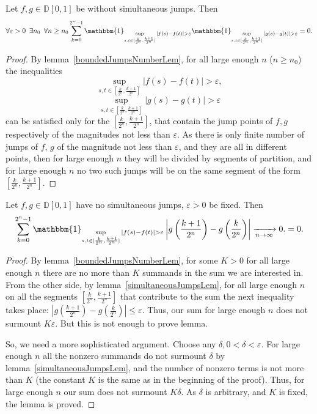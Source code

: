 \documentclass[12pt, a4paper, titlepage]{article}
\begin{document}
\begin{lem}\label{simultaneousJumpsLem}
 Let $f, g \in \mathbb{D}[0,1]$ be without simultaneous jumps. Then
 $$\forall \varepsilon>0 \enskip \exists n_0 \enskip \forall n\ge n_0
 \sum\limits_{k=0}^{2^n-1}
 \mathbbm{1}_{\sup\limits_{s,t \in [\frac{k}{2^n}, \frac{k+1}{2^n}]}|f(s)-f(t)|>\varepsilon}
 \mathbbm{1}_{\sup\limits_{s,t \in [\frac{k}{2^n}, \frac{k+1}{2^n}]}|g(s)-g(t)|>\varepsilon}
 =0.
 $$
 \end{lem}
 \begin{proof}
  By lemma~\ref{boundedJumpsNumberLem}, for all large enough $n$ ($n \ge n_0$)
the inequalities
  $$\sup\limits_{s,t \in [\frac{k}{2^n}, \frac{k+1}{2^n}]}|f(s)-f(t)|>\varepsilon,$$
  $$\sup\limits_{s,t \in [\frac{k}{2^n}, \frac{k+1}{2^n}]}|g(s)-g(t)|>\varepsilon$$
can be satisfied only for the $[\frac{k}{2^n}, \frac{k+1}{2^n}]$,
that contain the jump points of $f, g$ respectively of the magnitudes not less than $\varepsilon.$
As there is only finite number of jumps of $f$, $g$ of the magnitude not less than $\varepsilon$,
and they are all in different points, then for large enough $n$ they will be 
divided by segments of partition, and for large enough $n$
no two such jumps will be on the same segment of the form 
$[\frac{k}{2^n}, \frac{k+1}{2^n}]$.
\end{proof}

 
 \begin{lem}\label{sumOverJumpsLem}
  Let  $f, g \in \mathbb{D}[0,1]$ have no simultaneous jumps, $\varepsilon>0$
 be fixed. Then
 $$\sum\limits_{k=0}^{2^n-1}
 \mathbbm{1}_{\sup\limits_{s,t \in [\frac{k}{2^n}, \frac{k+1}{2^n}]}|f(s)-f(t)|>\varepsilon}
 \left|g\left(\frac{k+1}{2^n}\right)-g\left(\frac{k}{2^n}\right)\right|\xrightarrow[n\to\infty]{}0.
 =0.
 $$
 \end{lem}
 \begin{proof}
  By lemma~\ref{boundedJumpsNumberLem}, for some $K > 0$ for all large enough $n$
 there are no more than $K$ summands in the sum we are interested in. 
 From the other side, by lemma~\ref{simultaneousJumpsLem}, for all large enough $n$
 on all the segments $[\frac{k}{2^n}, \frac{k+1}{2^n}]$ that contribute to the sum
 the next inequality takes place:
 $\left|g\left(\frac{k+1}{2^n}\right)-g\left(\frac{k}{2^n}\right)\right| \le \varepsilon.$
 Thus, our sum for large enough $n$ does not surmount $K\varepsilon.$
 But this is not enough to prove lemma. 
 
 So, we need a more sophisticated argument. Choose any $\delta, 0 < \delta < \varepsilon.$
 For large enough $n$ all the nonzero summands do not surmount $\delta$
 by lemma~\ref{simultaneousJumpsLem}, and the number of nonzero terms 
 is not more than $K$ (the constant 
 $K$ is the same as in the beginning of the proof).
 Thus, for large enough $n$ our sum does not surmount $K\delta.$
 As $\delta$ is arbitrary, and $K$ is fixed, the lemma is proved.  
 \end{proof}
  
\end{document}

